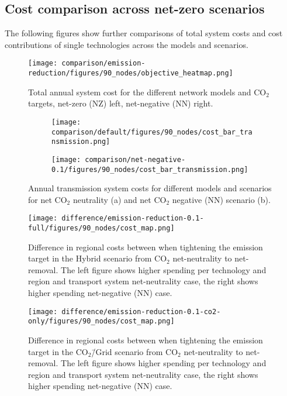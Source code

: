 \documentclass[twocolumn]{article}
\newcommand{\carbon}{CO$_2$}
\newcommand{\carbonscenario}{CO$_2$\=/Grid scenario}
\newcommand{\hybridscenario}{Hybrid scenario}
\begin{document}
\clearpage
\subsection{Cost comparison across net-zero scenarios}
\label{sec:cost_comparison}

The following figures show further comparisons of total system costs and cost contributions of single technologies across the models and scenarios.

\begin{figure}[h!]
    \centering
    \texttt{[image: comparison/emission-reduction/figures/90\_nodes/objective\_heatmap.png]}
    \caption{Total annual system cost for the different network models and \carbon{} targets, net-zero (NZ) left, net-negative (NN) right.}
    \label{fig:objective_heatmap}
\end{figure}

\begin{figure}[h!]
    \centering
    \begin{subfigure}{.5\textwidth}
        \centering
        \texttt{[image: comparison/default/figures/90\_nodes/cost\_bar\_transmission.png]}
        \caption{}
        \label{fig:cost_bar_transmission}
    \end{subfigure}%
    \begin{subfigure}{.5\textwidth}
        \centering
        \texttt{[image: comparison/net-negative-0.1/figures/90\_nodes/cost\_bar\_transmission.png]}
        \caption{}
        \label{fig:cost_bar_transmission_nn}
    \end{subfigure}
    \caption{Annual transmission system costs for different models and scenarios for net \carbon{} neutrality (a) and net \carbon{} negative (NN) scenario (b).}
\end{figure}


\begin{figure}[ht!]
    \centering
    \texttt{[image: difference/emission-reduction-0.1-full/figures/90\_nodes/cost\_map.png]}
    \caption{Difference in regional costs between when tightening the emission target in the \hybridscenario{} from \carbon{} net-neutrality to net-removal. The left figure shows higher spending per technology and region and transport system net-neutrality case, the right shows higher spending net-negative (NN) case.}
    \label{fig:cost_map_difference_full_nn}
\end{figure}


\begin{figure}[ht!]
    \centering
    \texttt{[image: difference/emission-reduction-0.1-co2-only/figures/90\_nodes/cost\_map.png]}
    \caption{Difference in regional costs between when tightening the emission target in the \carbonscenario{} from \carbon{} net-neutrality to net-removal. The left figure shows higher spending per technology and region and transport system net-neutrality case, the right shows higher spending net-negative (NN) case.}
    \label{fig:cost_map_difference_co2_nn}
\end{figure}
\end{document}
